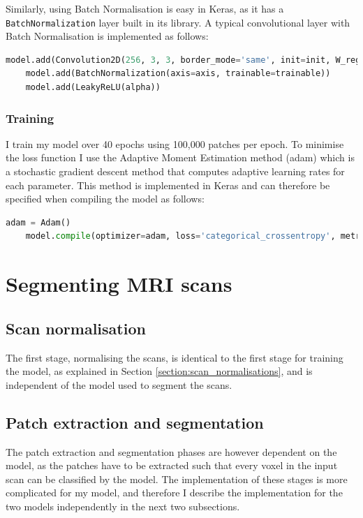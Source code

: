 \documentclass[12pt,a4paper,twoside,openright]{report}
\begin{document}
Similarly, using Batch Normalisation is easy in Keras, as it has a \texttt{BatchNormalization} layer built in its library. A typical convolutional layer with Batch Normalisation is implemented as follows:
\begin{lstlisting}[language=Python]
	model.add(Convolution2D(256, 3, 3, border_mode='same', init=init, W_regularizer=l2(l)))
	model.add(BatchNormalization(axis=axis, trainable=trainable))
	model.add(LeakyReLU(alpha))
\end{lstlisting}

\subsubsection{Training}
I train my model over 40 epochs using 100,000 patches per epoch. To minimise the loss function I use the Adaptive Moment Estimation method (adam) \cite{adam} which is a stochastic gradient descent method that computes adaptive learning rates for each parameter. This method is implemented in Keras and can therefore be specified when compiling the model as follows:
\begin{lstlisting}[language=Python]
	adam = Adam()
    model.compile(optimizer=adam, loss='categorical_crossentropy', metrics=['accuracy'])
\end{lstlisting}

\section{Segmenting MRI scans}
\subsection{Scan normalisation}
The first stage, normalising the scans, is identical to the first stage for training the model, as explained in Section \ref{section:scan_normalisations}, and is independent of the model used to segment the scans.

\subsection{Patch extraction and segmentation}
The patch extraction and segmentation phases are however dependent on the model, as the patches have to be extracted such that every voxel in the input scan can be classified by the model. The implementation of these stages is more complicated for my model, and therefore I describe the implementation for the two models independently in the next two subsections.
\end{document}
